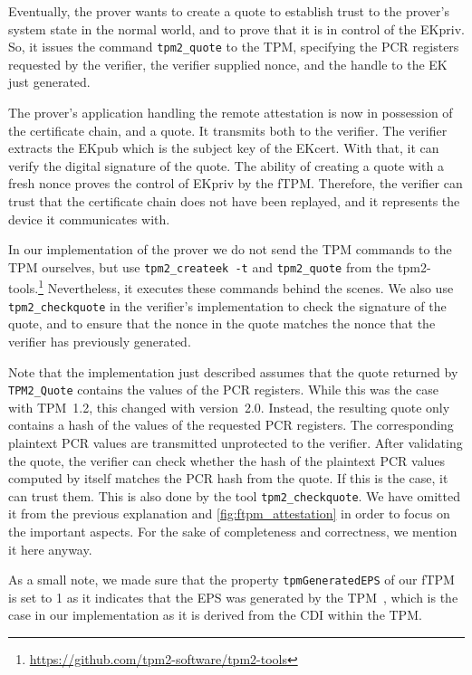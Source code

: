 Eventually, the prover wants to create a quote to establish trust to the prover's system state in the normal world, and to prove that it is in control of the EKpriv.
So, it issues the command \texttt{tpm2\_quote} to the TPM, specifying the PCR registers requested by the verifier, the verifier supplied nonce, and the handle to the EK just generated.

The prover's application handling the remote attestation is now in possession of the certificate chain, and a quote.
It transmits both to the verifier.
The verifier extracts the EKpub which is the subject key of the EKcert.
With that, it can verify the digital signature of the quote.
The ability of creating a quote with a fresh nonce proves the control of EKpriv by the fTPM\@.
Therefore, the verifier can trust that the certificate chain does not have been replayed, and it represents the device it communicates with.

In our implementation of the prover we do not send the TPM commands to the TPM ourselves, but use \texttt{tpm2\_createek~-t} and \texttt{tpm2\_quote} from the tpm2-tools.\footnote{\url{https://github.com/tpm2-software/tpm2-tools}}
Nevertheless, it executes these commands behind the scenes.
We also use \texttt{tpm2\_checkquote} in the verifier's implementation to check the signature of the quote, and to ensure that the nonce in the quote matches the nonce that the verifier has previously generated.

Note that the implementation just described assumes that the quote returned by \texttt{TPM2\_Quote} contains the values of the PCR registers.
While this was the case with TPM~1.2, this changed with version~2.0.
Instead, the resulting quote only contains a hash of the values of the requested PCR registers.
The corresponding plaintext PCR values are transmitted unprotected to the verifier.
After validating the quote, the verifier can check whether the hash of the plaintext PCR values computed by itself matches the PCR hash from the quote.
If this is the case, it can trust them.
This is also done by the tool \texttt{tpm2\_checkquote}.
We have omitted it from the previous explanation and \autoref{fig:ftpm_attestation} in order to focus on the important aspects.
For the sake of completeness and correctness, we mention it here anyway.

As a small note, we made sure that the property \texttt{tpmGeneratedEPS} of our fTPM is set to 1 as it indicates that the EPS was generated by the TPM~\cite{tpm}, which is the case in our implementation as it is derived from the CDI within the TPM\@.


